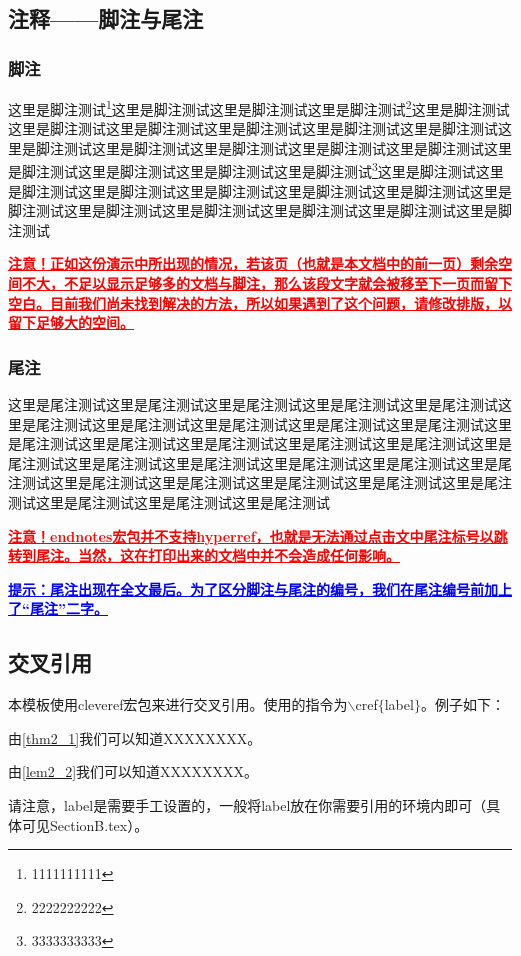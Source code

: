 \subsection{注释——脚注与尾注}
\subsubsection{脚注}
\par 这里是脚注测试\footnote{1111111111}这里是脚注测试这里是脚注测试这里是脚注测试\footnote{2222222222}这里是脚注测试这里是脚注测试这里是脚注测试这里是脚注测试这里是脚注测试这里是脚注测试这里是脚注测试这里是脚注测试这里是脚注测试这里是脚注测试这里是脚注测试这里是脚注测试这里是脚注测试这里是脚注测试这里是脚注测试\footnote{3333333333}这里是脚注测试这里是脚注测试这里是脚注测试这里是脚注测试这里是脚注测试这里是脚注测试这里是脚注测试这里是脚注测试这里是脚注测试这里是脚注测试这里是脚注测试这里是脚注测试

\textcolor{red}{\textbf{\uline{注意！正如这份演示中所出现的情况，若该页（也就是本文档中的前一页）剩余空间不大，不足以显示足够多的文档与脚注，那么该段文字就会被移至下一页而留下空白。目前我们尚未找到解决的方法，所以如果遇到了这个问题，请修改排版，以留下足够大的空间。}}}

\subsubsection{尾注}
\par 这里是尾注测试这里是尾注测试这里是尾注测试这里是尾注测试这里是尾注测试这里是尾注测试这里是尾注测试这里是尾注测试这里是尾注测试这里是尾注测试这里是尾注测试这里是尾注测试这里是尾注测试这里是尾注测试这里是尾注测试这里是尾注测试这里是尾注测试这里是尾注测试这里是尾注测试这里是尾注测试这里是尾注测试这里是尾注测试这里是尾注测试这里是尾注测试这里是尾注测试这里是尾注测试这里是尾注测试这里是尾注测试这里是尾注测试

\par \textcolor{red}{\textbf{\uline{注意！endnotes宏包并不支持hyperref，也就是无法通过点击文中尾注标号以跳转到尾注。当然，这在打印出来的文档中并不会造成任何影响。}}}
\par \textcolor{blue}{\textbf{\uline{提示：尾注出现在全文最后。为了区分脚注与尾注的编号，我们在尾注编号前加上了“尾注”二字。}}}

\subsection{交叉引用}
\par 本模板使用cleveref宏包来进行交叉引用。使用的指令为$\backslash$cref$\{$label$\}$。例子如下：
\par 由\cref{thm2_1}我们可以知道XXXXXXXX。
\par 由\cref{lem2_2}我们可以知道XXXXXXXX。
\par 请注意，label是需要手工设置的，一般将label放在你需要引用的环境内即可（具体可见SectionB.tex）。

